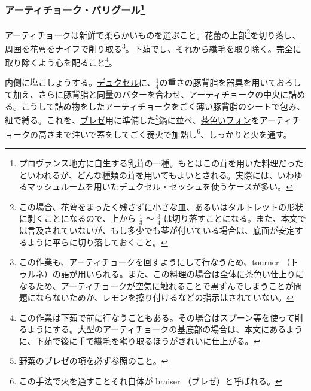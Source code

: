 \begin{recette}

\hypertarget{artichauts-a-la-barigoule}{%
\subsubsection[アーティチョーク・バリグール]{\texorpdfstring{アーティチョーク・バリグール\footnote{プロヴァンス地方に自生する乳茸の一種。もとはこの茸を用いた料理だったといわれるが、どんな種類の茸を用いてもよいとされる。実際には、いわゆるマッシュルームを用いたデュクセル・セッシュを使うケースが多い。}}{アーティチョーク・バリグール}}\label{artichauts-a-la-barigoule}}



アーティチョークは新鮮で柔らかいものを選ぶこと。花蕾の上部\footnote{この場合、花萼をまったく残さずに小さな皿、あるいはタルトレットの形状に剥くことになるので、上から
  \(\frac{1}{3}\) 〜 \(\frac{3}{4}\)
  は切り落すことになる。また、本文では言及されていないが、もし多少でも茎が付いている場合は、底面が安定するように平らに切り落しておくこと。}を切り落し、周囲を花萼をナイフで削り取る\footnote{この作業も、アーティチョークを回すようにして行なうため、tourner
  （トゥルネ）の語が用いられる。また、この料理の場合は全体に茶色い仕上りになるため、アーティチョークが空気に触れることで黒ずんでしまうことが問題にならないためか、レモンを擦り付けるなどの指示はされていない。}。\protect\hyperlink{blanchissage}{下茹で}し、それから繊毛を取り除く。完全に取り除くよう心を配ること\footnote{この作業は下茹で前に行なうこともある。その場合はスプーン等を使って削るようにする。大型のアーティチョークの基底部の場合は、本文にあるように、下茹で後に手で繊毛を毟り取るほうがきれいに仕上がる。}。

内側に塩こしょうする。\protect\hyperlink{duxelles-seche}{デュクセル}に、\(\frac{1}{4}\)の重さの豚背脂を器具を用いておろして加え、さらに豚背脂と同量のバターを合わせ、アーティチョークの中央に詰める。こうして詰め物をしたアーティチョークをごく薄い豚背脂のシートで包み、紐で縛る。これを、\protect\hyperlink{braisage-des-legumes}{ブレゼ}用に準備した\footnote{\protect\hyperlink{braisage-des-legumes}{野菜のブレゼ}の項を必ず参照のこと。}鍋に並べ、\protect\hyperlink{fonds-brun}{茶色いフォン}をアーティチョークの高さまで注いで蓋をしてごく弱火で加熱し\footnote{この手法で火を通すことそれ自体が
  braiser （ブレゼ）と呼ばれる。}、しっかりと火を通す。


\end{recette}
